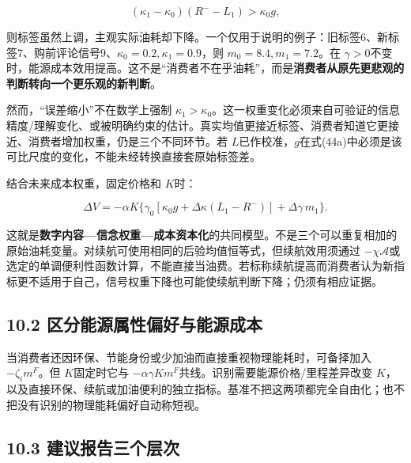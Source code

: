 \documentclass[
  11pt,
]{article}
\begin{document}
\[
(\kappa_1-\kappa_0)(R^--L_1)>\kappa_0g,
\tag{44b}
\]

则标签虽然上调，主观实际油耗却下降。一个仅用于说明的例子：旧标签6、新标签7、购前评论信号9、\(\kappa_0=0.2,\kappa_1=0.9\)，则
\(m_0=8.4,m_1=7.2\)。在
\(\gamma>0\)不变时，能源成本效用提高。这不是``消费者不在乎油耗''，而是\textbf{消费者从原先更悲观的判断转向一个更乐观的新判断}。

然而，``误差缩小''不在数学上强制
\(\kappa_1>\kappa_0\)。这一权重变化必须来自可验证的信息精度/理解变化、或被明确约束的估计。真实均值更接近标签、消费者知道它更接近、消费者增加权重，仍是三个不同环节。若
\(L\)已作校准，\(g\)在式(44a)中必须是该可比尺度的变化，不能未经转换直接套原始标签差。

结合未来成本权重，固定价格和 \(K\)时：

\[
\boxed{\Delta V=-\alpha K\{\gamma_0[\kappa_0g+\Delta\kappa(L_1-R^-)]
+\Delta\gamma\,m_1\}.}
\tag{44c}
\]

这就是\textbf{数字内容---信念权重---成本资本化}的共同模型。不是三个可以重复相加的原始油耗变量。对续航可使用相同的后验均值恒等式，但续航效用须通过
\(-\chi\mathcal A\)或选定的单调便利性函数计算，不能直接当油费。若标称续航提高而消费者认为新指标更不适用于自己，信号权重下降也可能使续航判断下降；仍须有相应证据。

\subsection{10.2
区分能源属性偏好与能源成本}\label{ux533aux5206ux80fdux6e90ux5c5eux6027ux504fux597dux4e0eux80fdux6e90ux6210ux672c}

当消费者还因环保、节能身份或少加油而直接重视物理能耗时，可备择加入
\(-\zeta_i m^F\)。但 \(K\)固定时它与
\(-\alpha\gamma K m^F\)共线。识别需要能源价格/里程差异改变
\(K\)，以及直接环保、续航或加油便利的独立指标。基准不把这两项都完全自由化；也不把没有识别的物理能耗偏好自动称短视。

\subsection{10.3
建议报告三个层次}\label{ux5efaux8baeux62a5ux544aux4e09ux4e2aux5c42ux6b21}
\end{document}
